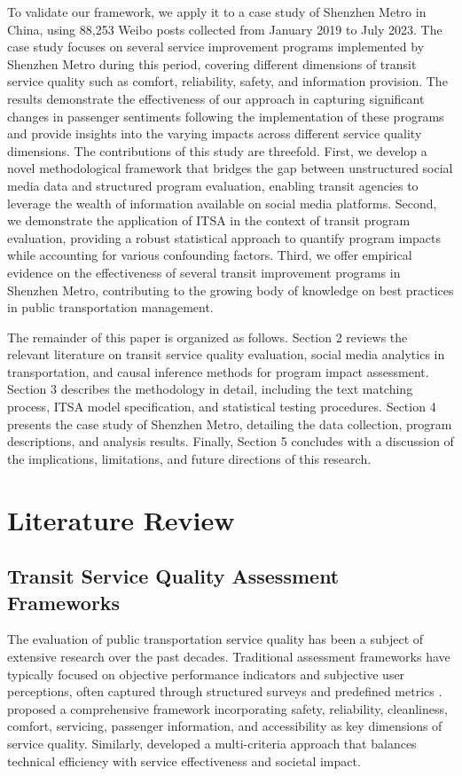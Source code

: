\documentclass[a4paper,fleqn,12pt]{cas-sc}
\begin{document}
To validate our framework, we apply it to a case study of Shenzhen Metro in China, using 88,253 Weibo posts collected from January 2019 to July 2023. The case study focuses on several service improvement programs implemented by Shenzhen Metro during this period, covering different dimensions of transit service quality such as comfort, reliability, safety, and information provision. The results demonstrate the effectiveness of our approach in capturing significant changes in passenger sentiments following the implementation of these programs and provide insights into the varying impacts across different service quality dimensions. The contributions of this study are threefold. First, we develop a novel methodological framework that bridges the gap between unstructured social media data and structured program evaluation, enabling transit agencies to leverage the wealth of information available on social media platforms. Second, we demonstrate the application of ITSA in the context of transit program evaluation, providing a robust statistical approach to quantify program impacts while accounting for various confounding factors. Third, we offer empirical evidence on the effectiveness of several transit improvement programs in Shenzhen Metro, contributing to the growing body of knowledge on best practices in public transportation management.

The remainder of this paper is organized as follows. Section 2 reviews the relevant literature on transit service quality evaluation, social media analytics in transportation, and causal inference methods for program impact assessment. Section 3 describes the methodology in detail, including the text matching process, ITSA model specification, and statistical testing procedures. Section 4 presents the case study of Shenzhen Metro, detailing the data collection, program descriptions, and analysis results. Finally, Section 5 concludes with a discussion of the implications, limitations, and future directions of this research.

\section{Literature Review}\label{sec:liter}

\subsection{Transit Service Quality Assessment Frameworks}
The evaluation of public transportation service quality has been a subject of extensive research over the past decades. Traditional assessment frameworks have typically focused on objective performance indicators and subjective user perceptions, often captured through structured surveys and predefined metrics \citep{de2013composite, eboli2011methodology}. \cite{nathanail2008measuring} proposed a comprehensive framework incorporating safety, reliability, cleanliness, comfort, servicing, passenger information, and accessibility as key dimensions of service quality. Similarly, \cite{dell2011public} developed a multi-criteria approach that balances technical efficiency with service effectiveness and societal impact.
\end{document}
